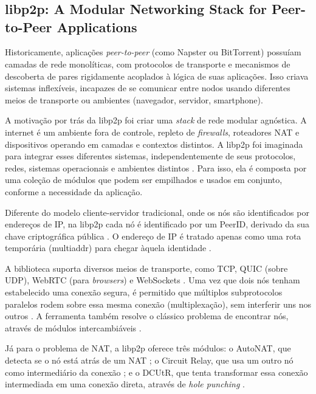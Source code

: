 \chapter{}

\section{libp2p: A Modular Networking Stack for Peer-to-Peer Applications}

Historicamente, aplicações \textit{peer-to-peer} (como Napster ou BitTorrent) possuíam camadas de rede monolíticas, com protocolos de transporte e mecanismos de descoberta de pares
rigidamente acoplados à lógica de suas aplicações. Isso criava sistemas inflexíveis, incapazes de se comunicar entre nodos usando diferentes meios
de transporte ou ambientes (navegador, servidor, smartphone).

A motivação por trás da libp2p foi criar uma \textit{stack} de rede modular agnóstica. A internet é um ambiente fora de controle, repleto de \textit{firewalls}, roteadores NAT e dispositivos
operando em camadas e contextos distintos. A libp2p foi imaginada para integrar esses diferentes sistemas, independentemente de seus protocolos, redes, sistemas operacionais e
ambientes distintos \cite{libp2p}. Para isso, ela é composta por uma coleção de módulos que podem ser empilhados e usados em conjunto, conforme a necessidade da aplicação.

Diferente do modelo cliente-servidor tradicional, onde os nós são identificados por endereços de IP, na libp2p cada nó é identificado por um PeerID, derivado da sua chave criptográfica pública \cite{libp2ppeerids}.
O endereço de IP é tratado apenas como uma rota temporária (multiaddr) para chegar àquela identidade \cite{multiaddr}.

A biblioteca suporta diversos meios de transporte, como TCP, QUIC (sobre UDP), WebRTC (para \textit{browsers}) e WebSockets \cite{libp2pspecs}. Uma vez que
dois nós tenham estabelecido uma conexão segura, é permitido que múltiplos subprotocolos paralelos rodem sobre essa mesma conexão (multiplexação), sem interferir uns nos outros \cite{libp2pconnections}. A ferramenta também
resolve o clássico problema de encontrar nós, através de módulos intercambiáveis \cite{libp2pspecs}.

Já para o problema de NAT, a libp2p oferece três módulos: o AutoNAT, que detecta se o nó está atrás de um NAT \cite{libp2pautonat}; o Circuit Relay, que usa um outro nó como intermediário
da conexão \cite{libp2prelay}; e o DCUtR, que tenta transformar essa conexão intermediada em uma conexão direta, através de \textit{hole punching} \cite{libp2pdcutr}.

